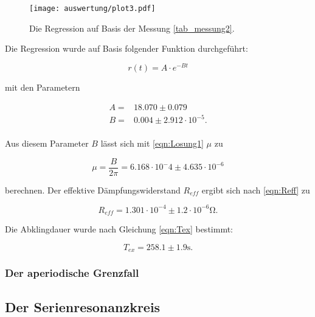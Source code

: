 \begin{figure}[H]
  \centering
  \texttt{[image: auswertung/plot3.pdf]}
  \caption{Die Regression auf Basis der Messung \ref{tab_messung2}.}
  \label{fig:regrmessung2}
\end{figure}

Die Regression wurde auf Basis folgender Funktion durchgeführt:

\begin{equation*}
  r(t) = A \cdot e^{-B t}
\end{equation*}

mit den Parametern

\begin{align*}
  A  = & 18.070 \pm  0.079 \\
  B  = & 0.004 \pm 2.912 \cdot 10^{-5}. \\
\end{align*}

Aus diesem Parameter $B$ lässt sich mit \eqref{eqn:Losung1} $\mu$ zu

\begin{equation}
  \mu = \frac{B}{2 \pi} = 6.168 \cdot 10^-{4} \pm  4.635 \cdot 10^{-6}
  \label{eqn:mu}
\end{equation}
\noindent

berechnen.
Der effektive Dämpfungswiderstand $R_{eff}$ ergibt sich nach \eqref{eqn:Reff} zu

\begin{equation}
  R_{eff} = 1.301 \cdot 10^{-4}  \pm 1.2 \cdot 10^{-6} \si{\ohm}.
  \label{eqn:reffauswertung}
\end{equation}

Die Abklingdauer wurde nach Gleichung \eqref{eqn:Tex} bestimmt:

\begin{equation}
  T_{ex} = 258.1 \pm 1.9 \si{\second}.
  \label{eqn:texauswerung}
\end{equation}


\subsubsection{Der aperiodische Grenzfall}

\subsection{Der Serienresonanzkreis}
